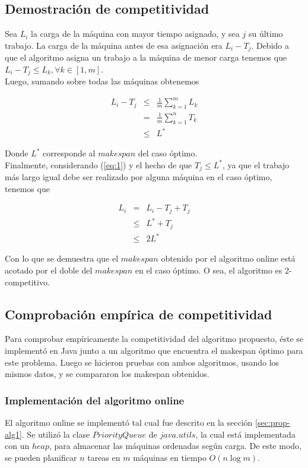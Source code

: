 \documentclass[12pt,letterpaper]{article}
\begin{document}
\subsection{Demostración de competitividad}
	Sea $L_{i}$ la carga de la máquina con mayor tiempo asignado, y sea $j$ su último trabajo. La carga de la máquina antes de esa asignación era $L_{i} - T_{j}$. Debido a que el algoritmo asigna un trabajo a la máquina de menor carga tenemos que $L_{i} - T_{j} \leq L_{k}, \forall k \in [1, m]$. \\
	
	Luego, sumando sobre todas las máquinas obtenemos
	
\begin{eqnarray}
L_{i} - T_{j}	&\leq& 		\frac{1}{m} \sum_{k=1}^{m} L_{k}	\nonumber \\
				&=& 		\frac{1}{m} \sum_{k=1}^{n} T_{k}  	\nonumber \\
				&\leq& 		L^{*} \label{eq:1}
\end{eqnarray}

Donde $L^{*}$ corresponde al $makespan$ del caso óptimo.\\

Finalmente, considerando (\ref{eq:1}) y el hecho de que $T_{j} \leq L^{*}$, ya que el trabajo más largo igual debe ser realizado por alguna máquina en el caso óptimo, tenemos que 

\begin{eqnarray}
L_{i}		&=&		L_{i} - T_{j} + T_{j}	\nonumber \\
			&\leq&	L^{*} + T_{j} 			\nonumber \\
			&\leq& 2 L^{*}
\end{eqnarray}

Con lo que se demuestra que el $makespan$ obtenido por el algoritmo online está acotado por el doble del $makespan$ en el caso óptimo. O sea, el algoritmo es 2-competitivo.

\subsection{Comprobación empírica de competitividad}
	Para comprobar empíricamente la competitividad del algoritmo propuesto, éste se implementó en Java junto a un algoritmo que encuentra el makespan óptimo para este problema. Luego se hicieron pruebas con ambos algoritmos, usando los mismos datos, y se compararon los makespan obtenidos.

\subsubsection{Implementación del algoritmo online}
	El algoritmo online se implementó tal cual fue descrito en la sección \ref{sec:prop-alg1}. Se utilizó la clase $PriorityQueue$ de $java.utils$, la cual está implementada con un $heap$, para almacenar las máquinas ordenadas según carga. De este modo, se pueden planificar $n$ tareas en $m$ máquinas en tiempo $O(n \log{m})$.
\end{document}
